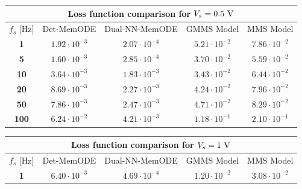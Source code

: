 \documentclass[11pt, oneside]{article}
\begin{document}
\begin{table}
    \centering
    \begin{tabular}{c|cccc}
        \toprule
        \multicolumn{5}{c}{\textbf{Loss function comparison for $V_s = 0.5 \rm \ V$}}                                                                                  \\
        \midrule
        $f_s$ [Hz]   & Det-MemODE           & Dual-NN-MemODE                                   & GMMS Model           & MMS Model                                      \\
        \midrule
        \textbf{1}   & $1.92 \cdot 10^{-3}$ & \color{ieeegreen} \bfseries $2.07 \cdot 10^{-4}$ & $5.21 \cdot 10^{-2}$ & \color{ieeered} \bfseries $7.86 \cdot 10^{-2}$ \\
        \textbf{5}   & $1.60 \cdot 10^{-3}$ & \color{ieeegreen} \bfseries $2.85 \cdot 10^{-4}$ & $3.70 \cdot 10^{-2}$ & \color{ieeered} \bfseries $5.59 \cdot 10^{-2}$ \\
        \textbf{10}  & $3.64 \cdot 10^{-3}$ & \color{ieeegreen} \bfseries $1.83 \cdot 10^{-3}$ & $3.43 \cdot 10^{-2}$ & \color{ieeered} \bfseries $6.44 \cdot 10^{-2}$ \\
        \textbf{20}  & $8.69 \cdot 10^{-3}$ & \color{ieeegreen} \bfseries $2.27 \cdot 10^{-3}$ & $4.24 \cdot 10^{-2}$ & \color{ieeered} \bfseries $7.96 \cdot 10^{-2}$ \\
        \textbf{50}  & $7.86 \cdot 10^{-3}$ & \color{ieeegreen} \bfseries $2.47 \cdot 10^{-3}$ & $4.71 \cdot 10^{-2}$ & \color{ieeered} \bfseries $8.29 \cdot 10^{-2}$ \\
        \textbf{100} & $6.24 \cdot 10^{-2}$ & \color{ieeegreen} \bfseries $4.21 \cdot 10^{-3}$ & $1.18 \cdot 10^{-1}$ & \color{ieeered} \bfseries $2.10 \cdot 10^{-1}$ \\
        \bottomrule
    \end{tabular}
    \begin{tabular}{c|cccc}
        \toprule
        \multicolumn{5}{c}{\textbf{Loss function comparison for $V_s = 1 \rm \ V$}}                                                                                    \\
        \midrule
        $f_s$ [Hz]   & Det-MemODE           & Dual-NN-MemODE                                   & GMMS Model           & MMS Model                                      \\
        \midrule
        \textbf{1}   & $6.40 \cdot 10^{-3}$ & \color{ieeegreen} \bfseries $4.69 \cdot 10^{-4}$ & $1.20 \cdot 10^{-2}$ & \color{ieeered} \bfseries $3.08 \cdot 10^{-2}$ \\

\end{tabular}
\end{table}
\end{document}
